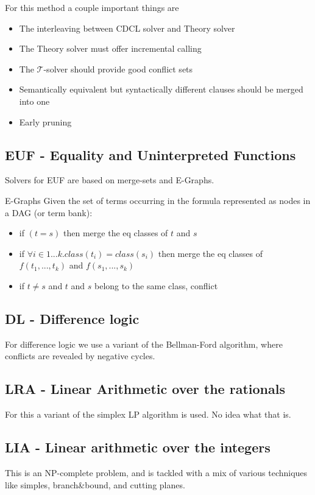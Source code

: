 \documentclass{article}
\begin{document}
For this method a couple important things are
\begin{itemize}
    \item The interleaving between CDCL solver and Theory solver
    \item The Theory solver must offer incremental calling
    \item The $\mathcal T$-solver should provide good conflict sets
    \item Semantically equivalent but syntactically different clauses should be merged into one
    \item Early pruning
\end{itemize}

\subsection*{EUF - Equality and Uninterpreted Functions}
Solvers for EUF are based on merge-sets and E-Graphs.
\begin{callout}{E-Graphs}
    Given the set of terms occurring in the formula represented as nodes in a DAG (or term bank):
    \begin{itemize}
        \item if $(t=s)$ then merge the eq classes of $t$ and $s$
        \item if $\forall i\in 1...k. class(t_i)=class(s_i)$ then merge the eq classes of $f(t_1,...,t_k)$ and $f(s_1,...,s_k)$
        \item if $t\neq s$ and $t$ and $s$ belong to the same class, conflict
    \end{itemize}
\end{callout}

\subsection*{DL - Difference logic}
For difference logic we use a variant of the Bellman-Ford algorithm, where conflicts are revealed by negative cycles.

\subsection*{LRA - Linear Arithmetic over the rationals}
For this a variant of the simplex LP algorithm is used. No idea what that is.

\subsection*{LIA - Linear arithmetic over the integers}
This is an NP-complete problem, and is tackled with a mix of various techniques like simples, branch&bound, and cutting planes.
\end{document}
